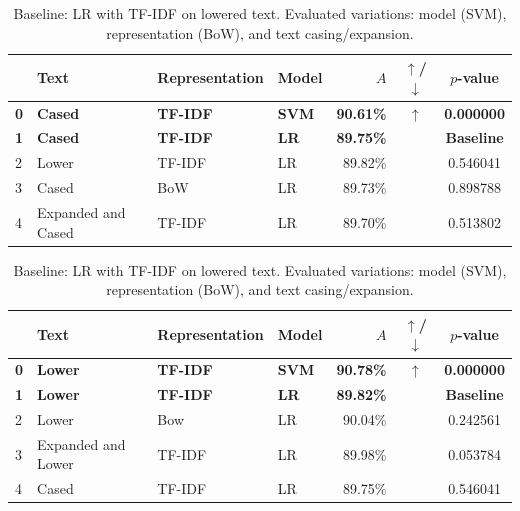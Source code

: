 \documentclass[a4paper,fleqn]{cas-dc}
\newcommand{\accuracy}{A}
\newcommand{\logreg}{LR}
\newcommand{\mcnemarp}{p}
\begin{document}
\begin{table}[tbp]
	\vspace{0.5em}
	
	\begin{subtable}{\textwidth}
		\centering
		\caption{Baseline: \logreg{} with TF-IDF on cased text. Evaluated variations: model (SVM), representation (BoW), and text lower-casing/expansion.}
		\label{tab:McNemarE1c}
		\begin{tabular}{llllrcc}
			\toprule
			& Text & Representation & Model & $\accuracy$ & $\uparrow$/$\downarrow$ & $\mcnemarp$-value \\
			\midrule
			\textbf{0} & \textbf{Cased} & \textbf{TF-IDF} & \textbf{SVM} & \textbf{90.61\%} & \textbf{$\uparrow$} & \textbf{0.000000} \\
			\textbf{1} & \textbf{Cased} & \textbf{TF-IDF} & \textbf{\logreg{}} & \textbf{89.75\%} & \textbf{} & \textbf{Baseline} \\
			2 & Lower & TF-IDF & \logreg{} & 89.82\% &  & 0.546041 \\
			3 & Cased & BoW & \logreg{} & 89.73\% &  & 0.898788 \\
			4 & Expanded and Cased & TF-IDF & \logreg{} & 89.70\% &  & 0.513802 \\
			\bottomrule
		\end{tabular}
	\end{subtable}
	
	\vspace{0.5em}
	
	\begin{subtable}{\textwidth}
		\centering
		\caption{Baseline: \logreg{} with TF-IDF on lowered text. Evaluated variations: model (SVM), representation (BoW), and text casing/expansion.}
		\label{tab:McNemarE1d}
		\begin{tabular}{llllrcc}
			\toprule
			& Text & Representation & Model & $\accuracy$ & $\uparrow$/$\downarrow$ & $\mcnemarp$-value \\
			\midrule
			\textbf{0} & \textbf{Lower} & \textbf{TF-IDF} & \textbf{SVM} & \textbf{90.78\%} & \textbf{$\uparrow$} & \textbf{0.000000} \\
			\textbf{1} & \textbf{Lower} & \textbf{TF-IDF} & \textbf{\logreg{}} & \textbf{89.82\%} & \textbf{} & \textbf{Baseline} \\
			2 & Lower & Bow & \logreg{} & 90.04\% &  & 0.242561 \\
			3 & Expanded and Lower & TF-IDF & \logreg{} & 89.98\% &  & 0.053784 \\
			4 & Cased & TF-IDF & \logreg{} & 89.75\% &  & 0.546041 \\
			\bottomrule
		\end{tabular}
	\end{subtable}
\end{table}
\end{document}
